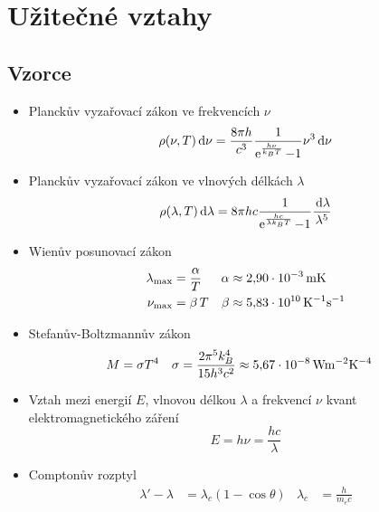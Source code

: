 \section{Užitečné vztahy}

\subsection{Vzorce}
\begin{itemize}
    \item Planckův vyzařovací zákon ve frekvencích $\nu$
        \begin{equation}
            \rho(\nu,T)\,\mathrm{d}\nu=\frac{8\pi h}{c^{3}}\frac{1}{\operatorname{e}^{\frac{h\nu}{k_{B}T}}-1}\nu^{3}\,\mathrm{d}\nu
        \end{equation}

    \item Planckův vyzařovací zákon ve vlnových délkách $\lambda$
        \begin{equation}
            \rho(\lambda,T)\,\mathrm{d}\lambda=8\pi h c\frac{1}{\operatorname{e}^{\frac{h c}{\lambda k_{B}T}}-1}\frac{\,\mathrm{d}\lambda}{\lambda^{5}}
        \end{equation}

    \item Wienův posunovací zákon
        \begin{align}
            \lambda_{\mathrm{max}}&=\frac{\alpha}{T}&\alpha&\approx 2,\!90\cdot10^{-3}\,\mathrm{{mK}}\\
            \nu_{\mathrm{max}}&=\beta\,T & \beta&\approx 5,\!83\cdot 10^{10}\,\mathrm{{K^{-1}s^{-1}}}
        \end{align}

    \item Stefanův-Boltzmannův zákon
        \begin{align}
            M&=\sigma T^{4} & \sigma&=\frac{2\pi^{5}k_{B}^{4}}{15h^{3}c^{2}}\approx 5,\!67\cdot10^{-8}\,\mathrm{{Wm^{-2}K^{-4}}}
        \end{align}

    \item Vztah mezi energií $E$, vlnovou délkou $\lambda$ a frekvencí $\nu$ kvant elektromagnetického záření
        \begin{equation}
            E=h\nu=\frac{hc}{\lambda}
        \end{equation}

    \item Comptonův rozptyl
        \begin{align}
            \lambda'-\lambda&=\lambda_{c}\left(1-\cos\theta\right) & \lambda_{c}&=\frac{h}{m_{e}c}
        \end{align}


\end{itemize}
